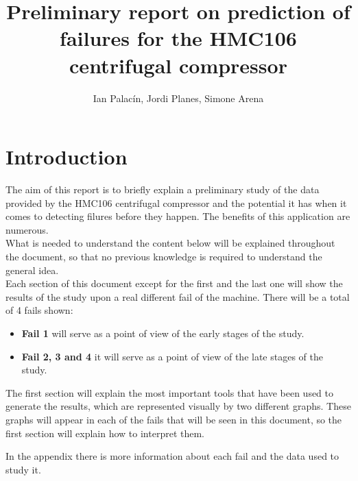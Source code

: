 \documentclass[11pt,twoside]{article}
\author{Ian Palacín, Jordi Planes, Simone Arena}
\title{Preliminary report on prediction of failures for the HMC106 centrifugal compressor} %
\begin{document}
\maketitle

\section{Introduction}
The aim of this report is to briefly explain a preliminary study of the data provided
by the HMC106 centrifugal compressor and the potential it has when it comes to detecting filures 
before they happen. The benefits of this application are numerous.\\
What is needed to understand the content below will be explained 
throughout the document, so that no previous knowledge is required to understand the general idea.\\
Each section of this document except for the first and the last one will show the results of the
study upon a real different fail of the machine. There will be a total of 4 fails shown:
\begin{itemize}
  \item \textbf{Fail 1} will serve as a point of view of the early stages of the study.
  \item \textbf{Fail 2, 3 and 4} it will serve as a point of view of the late stages of the study. 
\end{itemize}
The first section will explain the most important tools that have been used to generate the results,
which are represented visually by two different graphs. These graphs will appear in each of the fails
that will be seen in this document, so the first section will explain how to interpret them.


\noindent In the appendix there is more information about each fail and the data used to study it.

\newpage
\end{document}
